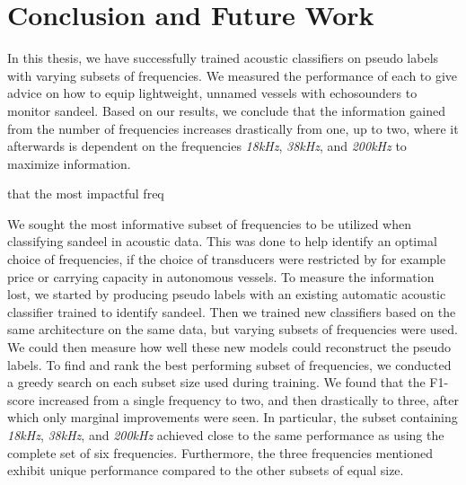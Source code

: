 \chapter{Conclusion and Future Work}
    In this thesis, we have successfully trained acoustic classifiers on pseudo labels with varying subsets of frequencies. We measured the performance of each to give advice on how to equip lightweight, unnamed vessels with echosounders to monitor sandeel.  Based on our results, we conclude that the information gained from the number of frequencies increases drastically from one, up to two, where it afterwards is dependent on the frequencies \textit{18kHz}, \textit{38kHz}, and \textit{200kHz} to maximize information.
    
    that the most impactful freq
    
    
    
    We sought the most informative subset of frequencies to be utilized when classifying sandeel in acoustic data. This was done to help identify an optimal choice of frequencies, if the choice of transducers were restricted by for example price or carrying capacity in autonomous vessels. To measure the information lost, we started by producing pseudo labels with an existing automatic acoustic classifier trained to identify sandeel. Then we trained new classifiers based on the same architecture on the same data, but varying subsets of frequencies were used. We could then measure how well these new models could reconstruct the pseudo labels. To find and rank the best performing subset of frequencies, we conducted a greedy search on each subset size used during training. We found that the F1-score increased from a single frequency to two, and then drastically to three, after which only marginal improvements were seen. In particular, the subset containing \textit{18kHz}, \textit{38kHz}, and \textit{200kHz} achieved close to the same performance as using the complete set of six frequencies. Furthermore, the three frequencies mentioned exhibit unique performance compared to the other subsets of equal size. 

